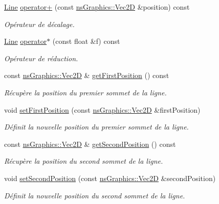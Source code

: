 \begin{DoxyCompactItemize}
\hyperlink{classns_shape_1_1_line}{Line} \hyperlink{classns_shape_1_1_line_adddeb7810639aa3eec2756846d40a430}{operator+} (const \hyperlink{classns_graphics_1_1_vec2_d}{ns\+Graphics\+::\+Vec2D} \&position) const
\begin{DoxyCompactList}\small\item\em Opérateur de décalage. \end{DoxyCompactList}\item 
\hyperlink{classns_shape_1_1_line}{Line} \hyperlink{classns_shape_1_1_line_a9686aab308107dff4799ec75a98d3aef}{operator$\ast$} (const float \&f) const
\begin{DoxyCompactList}\small\item\em Opérateur de réduction. \end{DoxyCompactList}\item 
const \hyperlink{classns_graphics_1_1_vec2_d}{ns\+Graphics\+::\+Vec2D} \& \hyperlink{classns_shape_1_1_line_a5e99d542b7557f79f58623b098672fdc}{get\+First\+Position} () const
\begin{DoxyCompactList}\small\item\em Récupère la position du premier sommet de la ligne. \end{DoxyCompactList}\item 
void \hyperlink{classns_shape_1_1_line_a62178d318a6b856e574149f58f9838f9}{set\+First\+Position} (const \hyperlink{classns_graphics_1_1_vec2_d}{ns\+Graphics\+::\+Vec2D} \&first\+Position)
\begin{DoxyCompactList}\small\item\em Définit la nouvelle position du premier sommet de la ligne. \end{DoxyCompactList}\item 
const \hyperlink{classns_graphics_1_1_vec2_d}{ns\+Graphics\+::\+Vec2D} \& \hyperlink{classns_shape_1_1_line_a3e239062daea5c0f247ccd9f454a45e8}{get\+Second\+Position} () const
\begin{DoxyCompactList}\small\item\em Récupère la position du second sommet de la ligne. \end{DoxyCompactList}\item 
void \hyperlink{classns_shape_1_1_line_ac8235be2b90d57497875a4265fc2bdc5}{set\+Second\+Position} (const \hyperlink{classns_graphics_1_1_vec2_d}{ns\+Graphics\+::\+Vec2D} \&second\+Position)
\begin{DoxyCompactList}\small\item\em Définit la nouvelle position du second sommet de la ligne. \end{DoxyCompactList}\item 

\end{DoxyCompactItemize}
